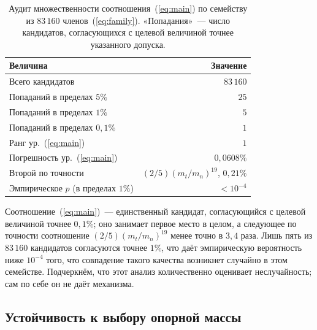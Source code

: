 \documentclass[aps,prd,twocolumn,amsmath,amssymb,floatfix,nofootinbib]{revtex4-2}
\begin{document}
\begin{table}[t]
\caption{Аудит множественности соотношения~(\ref{eq:main}) по семейству
из $83\,160$ членов~(\ref{eq:family}). «Попадания»~--- число кандидатов,
согласующихся с целевой величиной точнее указанного допуска.}
\label{tab:lookelsewhere}
\begin{ruledtabular}
\begin{tabular}{lr}
Величина & Значение \\
\hline
Всего кандидатов & $83\,160$ \\
Попаданий в пределах $5\%$ & $25$ \\
Попаданий в пределах $1\%$ & $5$ \\
Попаданий в пределах $0{,}1\%$ & $1$ \\
Ранг ур.~(\ref{eq:main}) & $1$ \\
Погрешность ур.~(\ref{eq:main}) & $0{,}0608\%$ \\
Второй по точности & $(2/5)(m_t/m_n)^{19}$, $0{,}21\%$ \\
Эмпирическое $p$ (в пределах $1\%$) & $<10^{-4}$ \\
\end{tabular}
\end{ruledtabular}
\end{table}

Соотношение~(\ref{eq:main})~--- единственный кандидат, согласующийся с
целевой величиной точнее $0{,}1\%$; оно занимает первое место в целом, а
следующее по точности соотношение $(2/5)(m_t/m_n)^{19}$ менее точно в $3{,}4$
раза. Лишь пять из $83\,160$ кандидатов согласуются точнее $1\%$, что даёт
эмпирическую вероятность ниже $10^{-4}$ того, что совпадение такого качества
возникнет случайно в этом семействе. Подчеркнём, что этот анализ
количественно оценивает неслучайность; сам по себе он не даёт механизма.

\subsection{Устойчивость к выбору опорной массы}
\label{sec:refmass}
\end{document}
